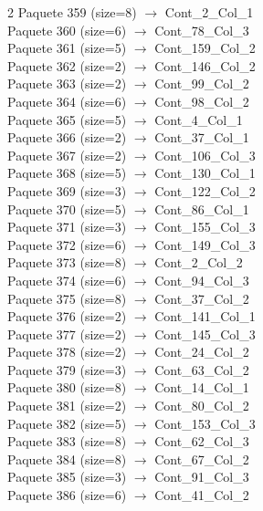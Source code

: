 \begin{multicols}{2}
Paquete 359 (size=8) $\rightarrow$ Cont\_2\_Col\_1\\
Paquete 360 (size=6) $\rightarrow$ Cont\_78\_Col\_3\\
Paquete 361 (size=5) $\rightarrow$ Cont\_159\_Col\_2\\
Paquete 362 (size=2) $\rightarrow$ Cont\_146\_Col\_2\\
Paquete 363 (size=2) $\rightarrow$ Cont\_99\_Col\_2\\
Paquete 364 (size=6) $\rightarrow$ Cont\_98\_Col\_2\\
Paquete 365 (size=5) $\rightarrow$ Cont\_4\_Col\_1\\
Paquete 366 (size=2) $\rightarrow$ Cont\_37\_Col\_1\\
Paquete 367 (size=2) $\rightarrow$ Cont\_106\_Col\_3\\
Paquete 368 (size=5) $\rightarrow$ Cont\_130\_Col\_1\\
Paquete 369 (size=3) $\rightarrow$ Cont\_122\_Col\_2\\
Paquete 370 (size=5) $\rightarrow$ Cont\_86\_Col\_1\\
Paquete 371 (size=3) $\rightarrow$ Cont\_155\_Col\_3\\
Paquete 372 (size=6) $\rightarrow$ Cont\_149\_Col\_3\\
Paquete 373 (size=8) $\rightarrow$ Cont\_2\_Col\_2\\
Paquete 374 (size=6) $\rightarrow$ Cont\_94\_Col\_3\\
Paquete 375 (size=8) $\rightarrow$ Cont\_37\_Col\_2\\
Paquete 376 (size=2) $\rightarrow$ Cont\_141\_Col\_1\\
Paquete 377 (size=2) $\rightarrow$ Cont\_145\_Col\_3\\
Paquete 378 (size=2) $\rightarrow$ Cont\_24\_Col\_2\\
Paquete 379 (size=3) $\rightarrow$ Cont\_63\_Col\_2\\
Paquete 380 (size=8) $\rightarrow$ Cont\_14\_Col\_1\\
Paquete 381 (size=2) $\rightarrow$ Cont\_80\_Col\_2\\
Paquete 382 (size=5) $\rightarrow$ Cont\_153\_Col\_3\\
Paquete 383 (size=8) $\rightarrow$ Cont\_62\_Col\_3\\
Paquete 384 (size=8) $\rightarrow$ Cont\_67\_Col\_2\\
Paquete 385 (size=3) $\rightarrow$ Cont\_91\_Col\_3\\
Paquete 386 (size=6) $\rightarrow$ Cont\_41\_Col\_2\\

\end{multicols}
